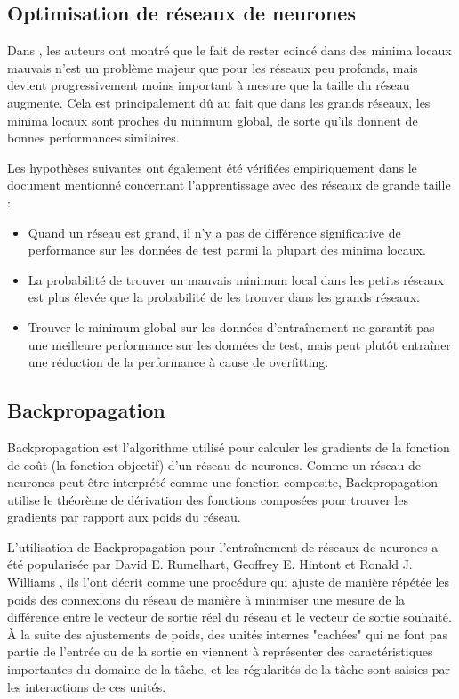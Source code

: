 \subsection{Optimisation de réseaux de neurones}
Dans \cite{Choromanska2014}, les auteurs ont montré que le fait de rester coincé dans des minima locaux mauvais n'est un problème majeur que pour les réseaux peu profonds, mais devient progressivement moins important à mesure que la taille du réseau augmente. Cela est principalement dû au fait que dans les grands réseaux, les minima locaux sont proches du minimum global, de sorte qu'ils donnent de bonnes performances similaires.

Les hypothèses suivantes ont également été vérifiées empiriquement dans le document mentionné concernant l'apprentissage avec des réseaux de grande taille :
\begin{itemize}
    \item Quand un réseau est grand, il n'y a pas de différence significative de performance sur les données de test parmi la plupart des minima locaux.
    \item La probabilité de trouver un mauvais minimum local dans les petits réseaux est plus élevée que la probabilité de les trouver dans les grands réseaux.
    \item Trouver le minimum global sur les données d'entraînement ne garantit pas une meilleure performance sur les données de test, mais peut plutôt entraîner une réduction de la performance à cause de overfitting.
\end{itemize}

\subsection{Backpropagation}
Backpropagation est l'algorithme utilisé pour calculer les gradients de la fonction de coût (la fonction objectif) d'un réseau de neurones. Comme un réseau de neurones peut être interprété comme une fonction composite, Backpropagation utilise le théorème de dérivation des fonctions composées
pour trouver les gradients par rapport aux poids du réseau.

L'utilisation de Backpropagation pour l'entraînement de réseaux de neurones a été popularisée par David E. Rumelhart, Geoffrey E. Hintont et Ronald J. Williams \cite{Rumelhart1986}, ils l'ont décrit comme une procédure qui ajuste de manière répétée les poids des connexions du réseau de manière à minimiser une mesure de la différence entre le vecteur de sortie réel du réseau et le vecteur de sortie souhaité. À la suite des ajustements de poids, des unités internes "cachées" qui ne font pas partie de l'entrée ou de la sortie en viennent à représenter des caractéristiques importantes du domaine de la tâche, et les régularités de la tâche sont saisies par les interactions de ces unités.

